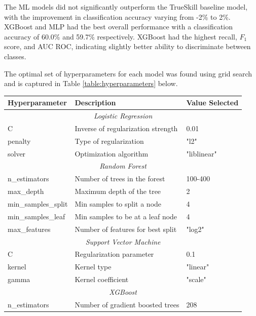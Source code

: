 The ML models did not significantly outperform the TrueSkill baseline model, with the improvement in classification accuracy varying from -2\% to 2\%. XGBoost and MLP had the best overall performance with a classification accuracy of 60.0\% and 59.7\%  respectively. XGBoost had the highest recall, $F_1$ score, and AUC ROC, indicating slightly better ability to discriminate between classes.

The optimal set of hyperparameters for each model was found using grid search and is captured in Table \ref{table:hyperparameters} below.

 \begin{table}[h]
	\centering
	\small
	\begin{adjustbox}{center}
		\begin{tabular}{|l|l|l|}
			\hline
			\rule{0pt}{2.5ex}\textbf{Hyperparameter} & \textbf{Description} & \textbf{Value Selected} \\
			\hline
			\multicolumn{3}{|c|}{\rule{0pt}{2.5ex}\textit{Logistic Regression}} \\
			\hline
			C & Inverse of regularization strength & 0.01 \\
			penalty & Type of regularization & "l2" \\
			solver & Optimization algorithm & "liblinear" \\
			\hline
			\multicolumn{3}{|c|}{\rule{0pt}{2.5ex}\textit{Random Forest}} \\
			\hline
			n\_estimators & Number of trees in the forest & 100-400 \\
			max\_depth & Maximum depth of the tree & 2 \\
			min\_samples\_split & Min samples to split a node & 4 \\
			min\_samples\_leaf & Min samples to be at a leaf node & 4 \\
			max\_features & Number of features for best split & "log2" \\
			\hline
			\multicolumn{3}{|c|}{\rule{0pt}{2.5ex}\textit{Support Vector Machine}} \\
			\hline
			C & Regularization parameter & 0.1 \\
			kernel & Kernel type & "linear" \\
			gamma & Kernel coefficient & "scale" \\
			\hline
			\multicolumn{3}{|c|}{\rule{0pt}{2.5ex}\textit{XGBoost}} \\
			\hline
			n\_estimators & Number of gradient boosted trees & 208 \\

\end{tabular}
\end{adjustbox}
\end{table}
